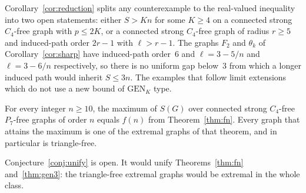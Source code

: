 \documentclass[ASNA]{USG}
\theoremstyle{WBstyletwo}
\numberwithin{equation}{section}
\newcommand{\lr}{\ell}
\newcommand{\pp}{p}
\newcommand{\GEN}{\mathrm{GEN}}
\begin{document}
Corollary~\ref{cor:reduction} splits any counterexample to the real-valued inequality into two open statements: either $S>Kn$ for some $K\ge 4$ on a connected strong $C_4$-free graph with $\pp\le 2K$, or a connected strong $C_4$-free graph of radius $r\ge 5$ and induced-path order $2r-1$ with $\lr>r-1$. The graphs $F_2$ and $\theta_k$ of Corollary~\ref{cor:sharp} have induced-path order~$6$ and $\lr=3-5/n$ and $\lr=3-6/n$ respectively, so there is no uniform gap below~$3$ from which a longer induced path would inherit $S\le 3n$. The examples that follow limit extensions which do not use a new bound of $\GEN_K$ type.

\begin{conjecture}\label{conj:unify}
For every integer $n\ge 10$, the maximum of $S(G)$ over connected strong $C_4$-free $P_7$-free graphs of order $n$ equals $f(n)$ from Theorem~\ref{thm:fn}. Every graph that attains the maximum is one of the extremal graphs of that theorem, and in particular is triangle-free.
\end{conjecture}

Conjecture~\ref{conj:unify} is open. It would unify Theorems~\ref{thm:fn} and~\ref{thm:gen3}: the triangle-free extremal graphs would be extremal in the whole class.
\end{document}
